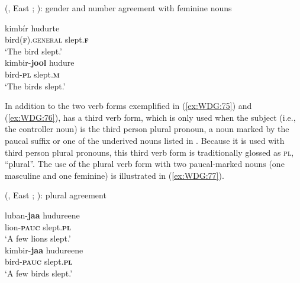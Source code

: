 \documentclass[output=collectionpaper]{langsci/langscibook}
\begin{document}
%

\ea\label{ex:WDG:76}
 (, East ; \citealt[182]{Corbett2000}): gender and number agreement with feminine nouns\\
\begin{xlist}
\ex
\gll 	kimbír 	hudurte \\
	bird(\textbf{\textsc{f}}).\textsc{general} 	slept.\textbf{\textsc{f}} \\
\glt	`The bird slept.' \\
\ex
\gll 	kimbir-\textbf{jool} 	hudure \\
	bird-\textbf{\textsc{pl}} 	slept.\textbf{\textsc{m}} \\
\glt	`The birds slept.' \\
\end{xlist}
\z

In addition to the two verb forms exemplified in (\ref{ex:WDG:75}) and (\ref{ex:WDG:76}),  has a third verb form, which is only used when the subject (i.e., the controller noun) is the third person plural pronoun, a noun marked by the paucal suffix or one of the underived nouns listed in . Because it is used with third person plural pronouns, this third verb form is traditionally glossed as \textsc{pl}, ``plural''. The use of the plural verb form with two paucal-marked nouns (one masculine and one feminine) is illustrated in (\ref{ex:WDG:77}).

\ea\label{ex:WDG:77}
 (, East ; \citealt[181--182]{Corbett2000}): plural agreement\\
\begin{xlist}
\ex
\gll 	luban-\textbf{jaa} 	hudureene\\
lion-\textbf{\textsc{pauc}} 	slept.\textbf{\textsc{pl}} \\
\glt		`A few lions slept.' \\
\ex
\gll 	kimbir-\textbf{jaa} 	hudureene\\
bird-\textbf{\textsc{pauc}} 	slept.\textbf{\textsc{pl}} \\
\glt		`A few birds slept.' \\
\end{xlist}
\z
\end{document}
